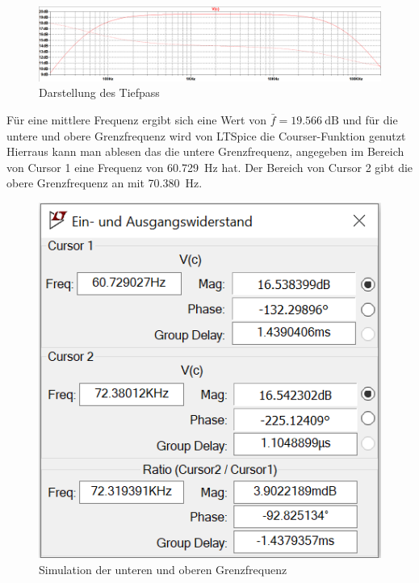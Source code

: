             \begin{figure}[h!t]
                \centering
                \includegraphics[width=\linewidth]{3233.PNG}
                \caption{Darstellung des Tiefpass}
                \label{tief}
            \end{figure}
            \par
            Für eine mittlere Frequenz ergibt sich eine Wert von \(\bar{f} = \SI{19,566}{\dB}\) und für die untere und obere Grenzfrequenz wird von LTSpice die Courser-Funktion genutzt  
            Hierraus kann man ablesen das die untere Grenzfrequenz, angegeben im Bereich von Cursor 1 eine Frequenz von \SI{60.729}{\Hz} hat. Der Bereich von Cursor 2 gibt die obere Grenzfrequenz an mit \SI{70,380}{\Hz}.
            \begin{figure}[h!t]
                \centering
                \includegraphics[scale=0.7]{cursor.PNG}
                \caption{Simulation der unteren und oberen Grenzfrequenz}
                \label{grenzfrequenz}
            \end{figure}



